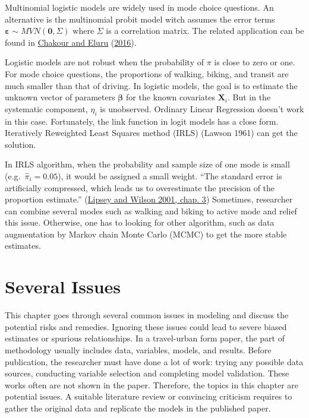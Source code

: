 \documentclass[
  11pt,
  openany]{memoir}
\begin{document}
Multinomial logistic models are widely used in mode choice questions.
An alternative is the multinomial probit model witch assumes the error terms \(\boldsymbol\varepsilon\sim MVN(\mathbf{0},\Sigma)\) where \(\Sigma\) is a correlation matrix. The related application can be found in \protect\hyperlink{ref-chakourExaminingInfluenceStop2016}{Chakour and Eluru} (\protect\hyperlink{ref-chakourExaminingInfluenceStop2016}{2016}).

Logistic models are not robust when the probability of \(\pi\) is close to zero or one.
For mode choice questions, the proportions of walking, biking, and transit are much smaller than that of driving.
In logistic models, the goal is to estimate the unknown vector of parameters \(\boldsymbol\beta\) for the known covariates \(\mathbf{X}_i\).
But in the systematic component, \(\eta_i\) is unobserved. Ordinary Linear Regression doesn't work in this case.
Fortunately, the link function in logit models has a close form.
Iteratively Reweighted Least Squares method (IRLS) (Lawson 1961) can get the solution.

In IRLS algorithm, when the probability and sample size of one mode is small (e.g.~\(\hat\pi_i=0.05\)), it would be assigned a small weight. ``The standard error is artificially compressed, which leads us to overestimate the precision of the proportion estimate.'' (\protect\hyperlink{ref-lipseyPracticalMetaanalysis2001}{Lipsey and Wilson 2001, chap. 3})
Sometimes, researcher can combine several modes such as walking and biking to active mode and relief this issue.
Otherwise, one has to looking for other algorithm, such as data augmentation by Markov chain Monte Carlo (MCMC) to get the more stable estimates.

\hypertarget{several-issues}{%
\chapter{Several Issues}\label{several-issues}}

This chapter goes through several common issues in modeling and discuss the potential risks and remedies.
Ignoring these issues could lead to severe biased estimates or spurious relationships.
In a travel-urban form paper, the part of methodology usually includes data, variables, models, and results. Before publication, the researcher must have done a lot of work: trying any possible data sources, conducting variable selection and completing model validation.
These works often are not shown in the paper.
Therefore, the topics in this chapter are potential issues.
A suitable literature review or convincing criticism requires to gather the original data and replicate the models in the published paper.
\end{document}
